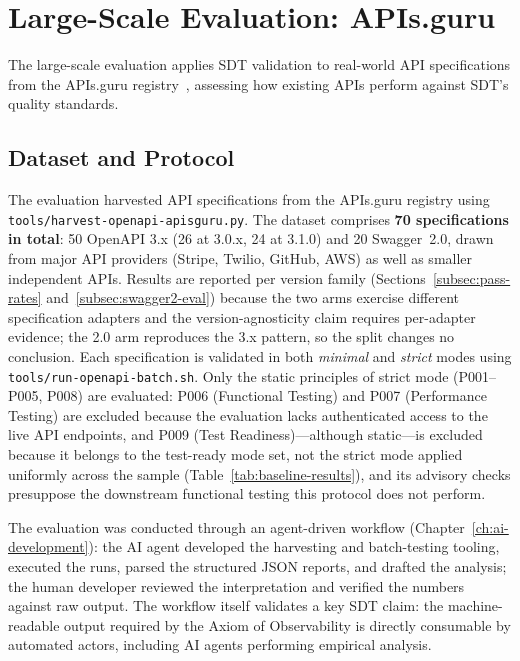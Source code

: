 \section{Large-Scale Evaluation: APIs.guru}
\label{sec:wild-eval}

The large-scale evaluation applies SDT validation to real-world API specifications from the APIs.guru registry~\cite{apis-guru}, assessing how existing APIs perform against SDT's quality standards.

\subsection{Dataset and Protocol}
\label{subsec:dataset}

The evaluation harvested API specifications from the APIs.guru registry using \texttt{tools/harvest-openapi-apisguru.py}. The dataset comprises \textbf{70 specifications in total}: 50 OpenAPI 3.x (26 at 3.0.x, 24 at 3.1.0) and 20 Swagger~2.0, drawn from major API providers (Stripe, Twilio, GitHub, AWS) as well as smaller independent APIs. Results are reported per version family (Sections~\ref{subsec:pass-rates} and~\ref{subsec:swagger2-eval}) because the two arms exercise different specification adapters and the version-agnosticity claim requires per-adapter evidence; the 2.0 arm reproduces the 3.x pattern, so the split changes no conclusion. Each specification is validated in both \textit{minimal} and \textit{strict} modes using \texttt{tools/run-openapi-batch.sh}. Only the static principles of strict mode (P001--P005, P008) are evaluated: P006 (Functional Testing) and P007 (Performance Testing) are excluded because the evaluation lacks authenticated access to the live API endpoints, and P009 (Test Readiness)---although static---is excluded because it belongs to the test-ready mode set, not the strict mode applied uniformly across the sample (Table~\ref{tab:baseline-results}), and its advisory checks presuppose the downstream functional testing this protocol does not perform.

The evaluation was conducted through an agent-driven workflow (Chapter~\ref{ch:ai-development}): the AI agent developed the harvesting and batch-testing tooling, executed the runs, parsed the structured JSON reports, and drafted the analysis; the human developer reviewed the interpretation and verified the numbers against raw output. The workflow itself validates a key SDT claim: the machine-readable output required by the Axiom of Observability is directly consumable by automated actors, including AI agents performing empirical analysis.

